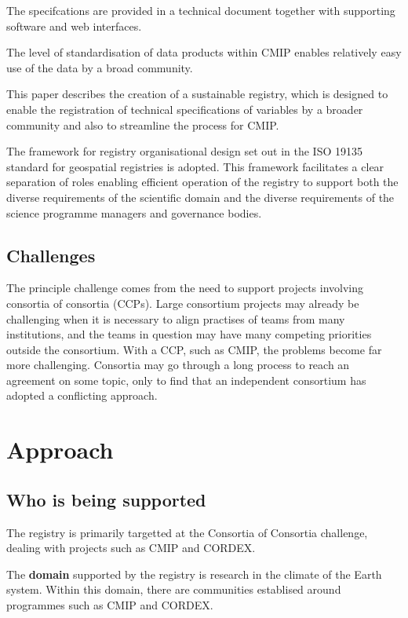 \documentclass[gmd,dvipsnames]{copernicus}
\begin{document}
The specifcations are provided in a technical document together with supporting software and web interfaces. 

The level of standardisation of data products within CMIP enables relatively easy use of the data by a broad community.

This paper describes the creation of a sustainable registry, which is designed to enable the registration
of technical specifications of variables by a broader community and also to streamline the process for CMIP.


The framework for registry organisational design set out in the ISO 19135 standard for geospatial registries
is adopted. This framework facilitates a clear separation of roles enabling efficient operation of the 
registry to support both the diverse requirements of the scientific domain and the diverse requirements of the 
science programme managers and governance bodies.


\subsection{Challenges}

The principle challenge comes from the need to support projects involving consortia of consortia (CCPs). Large consortium
projects may already be challenging when it is necessary to align practises of teams from many institutions, and the teams
in question may have many competing priorities outside the consortium. With a CCP, such as CMIP, the problems become 
far more challenging. Consortia may go through a long process to reach an agreement on some topic, only to find that an
independent consortium has adopted a conflicting approach. 

\section{Approach}

\subsection{Who is being supported}

The registry is primarily targetted at the Consortia of Consortia challenge, dealing with projects such as CMIP and CORDEX.

The {\bf domain} supported by the registry is research in the climate of the Earth system. Within this domain, there are communities 
establised around programmes such as CMIP and CORDEX. 
\end{document}
